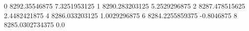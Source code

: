 0 8292.35546875 7.3251953125
1 8290.283203125 5.2529296875
2 8287.478515625 2.4482421875
4 8286.033203125 1.0029296875
6 8284.2255859375 -0.8046875
8 8285.0302734375 0.0
